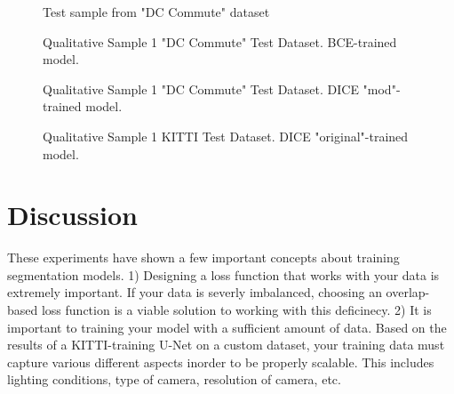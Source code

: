 \documentclass[Location Location Location! : Exploring Image Segmentation Problem In Urban Driving Scenarios]{IEEEtran}
\begin{document}
\begin{figure}[htbp]
\caption{Test sample from "DC Commute" dataset}
\label{dc-sample-1-input}
\end{figure}


\begin{figure}[htbp]
\caption{Qualitative Sample 1 "DC Commute" Test Dataset. BCE-trained model. }
\label{dc-sample-1-bce}
\end{figure}



\begin{figure}[htbp]
\caption{Qualitative Sample 1 "DC Commute" Test Dataset. DICE "mod"-trained model.}
\label{dc-sample-1-dice-mod}
\end{figure}



\begin{figure}[htbp]
\caption{Qualitative Sample 1 KITTI Test Dataset. DICE "original"-trained model.}
\label{dc-sample-1-dice-og}
\end{figure}




\section{Discussion}

These experiments have shown a few important concepts about training segmentation models. 1) Designing a loss function that works with your data is extremely important. If your data is severly imbalanced, choosing an overlap-based loss function is a viable solution to working with this deficinecy. 2) It is important to training your model with a sufficient amount of data. Based on the results of a KITTI-training U-Net on a custom dataset, your training data must capture various different aspects inorder to be properly scalable. This includes lighting conditions, type of camera, resolution of camera, etc. 
\end{document}
